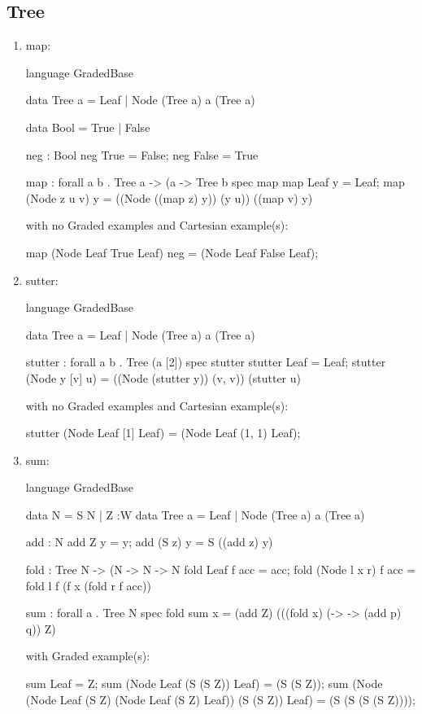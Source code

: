 \subsection{Tree}
\begin{enumerate}
\item map: 
\begin{granule}
language GradedBase

data Tree a = Leaf | Node (Tree a) a (Tree a)

data Bool = True | False

neg : Bool %
neg True = False; 
neg False = True

map : forall a b 
    . Tree a %
    -> (a %
    -> Tree b
spec
    map %
map Leaf y = Leaf;
map (Node z u v) y = ((Node ((map z) y)) (y u)) ((map v) y)
\end{granule}
with no Graded examples and Cartesian example(s):
\begin{granule}
map (Node Leaf True Leaf) neg = (Node Leaf False Leaf);
\end{granule}
\item sutter: 
\begin{granule}
language GradedBase

data Tree a = Leaf | Node (Tree a) a (Tree a)

stutter : forall a b . Tree (a [2]) %
spec
    stutter %
stutter Leaf = Leaf;
stutter (Node y [v] u) = ((Node (stutter y)) (v, v)) (stutter u)
\end{granule}
with no Graded examples and Cartesian example(s):
\begin{granule}
stutter (Node Leaf [1] Leaf) = (Node Leaf (1, 1) Leaf);
\end{granule}
\item sum: 
\begin{granule}
language GradedBase

data N = S N | Z
:W
data Tree a = Leaf | Node (Tree a) a (Tree a)

add : N %
add Z y = y;
add (S z) y = S ((add z) y)

fold : Tree N %
     -> (N %
     -> N %
     -> N 
fold Leaf f acc = acc;
fold (Node l x r) f acc = 
    fold l f (f x (fold r f acc))

sum : forall a . Tree N %
spec 
    fold %
sum x = (add Z) (((fold x) (\p -> \q -> (add p) q)) Z)
\end{granule}
with Graded example(s):
\begin{granule}
sum Leaf = Z;
sum (Node Leaf (S (S Z)) Leaf) = (S (S Z));
sum (Node (Node Leaf (S Z) (Node Leaf (S Z) Leaf)) (S (S Z)) Leaf) = (S (S (S (S Z))));
\end{granule}
\end{enumerate}
